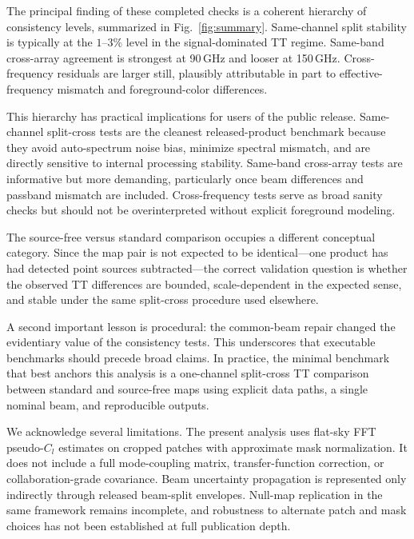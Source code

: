 \documentclass[twocolumn,showpacs,preprintnumbers,amsmath,amssymb,floatfix,prd]{revtex4-2}
\def\ell{l}%
\begin{document}
The principal finding of these completed checks is a coherent hierarchy of consistency levels, summarized in Fig.~\ref{fig:summary}.
Same-channel split stability is typically at the $1$--$3\%$ level in the signal-dominated TT regime.
Same-band cross-array agreement is strongest at 90\,GHz and looser at 150\,GHz.
Cross-frequency residuals are larger still, plausibly attributable in part to effective-frequency mismatch and foreground-color differences.

This hierarchy has practical implications for users of the public release.
Same-channel split-cross tests are the cleanest released-product benchmark because they avoid auto-spectrum noise bias, minimize spectral mismatch, and are directly sensitive to internal processing stability.
Same-band cross-array tests are informative but more demanding, particularly once beam differences and passband mismatch are included.
Cross-frequency tests serve as broad sanity checks but should not be overinterpreted without explicit foreground modeling.

The source-free versus standard comparison occupies a different conceptual category.
Since the map pair is not expected to be identical---one product has had detected point sources subtracted---the correct validation question is whether the observed TT differences are bounded, scale-dependent in the expected sense, and stable under the same split-cross procedure used elsewhere.

A second important lesson is procedural: the common-beam repair changed the evidentiary value of the consistency tests.
This underscores that executable benchmarks should precede broad claims.
In practice, the minimal benchmark that best anchors this analysis is a one-channel split-cross TT comparison between standard and source-free maps using explicit data paths, a single nominal beam, and reproducible outputs.

We acknowledge several limitations.
The present analysis uses flat-sky FFT pseudo-$C_\ell$ estimates on cropped patches with approximate mask normalization.
It does not include a full mode-coupling matrix, transfer-function correction, or collaboration-grade covariance.
Beam uncertainty propagation is represented only indirectly through released beam-split envelopes.
Null-map replication in the same framework remains incomplete, and robustness to alternate patch and mask choices has not been established at full publication depth.

\end{document}
